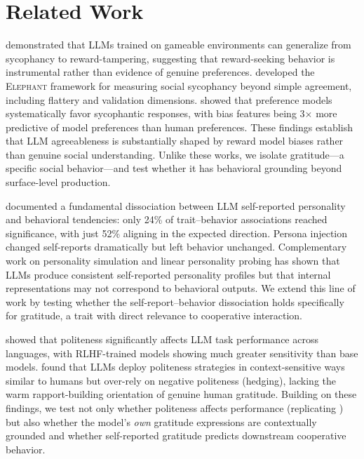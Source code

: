 \section{Related Work}
\label{sec:related}

\citet{denison2024sycophancy} demonstrated that LLMs trained on gameable environments can generalize from sycophancy to reward-tampering, suggesting that reward-seeking behavior is instrumental rather than evidence of genuine preferences. \citet{cheng2025elephant} developed the \textsc{Elephant} framework for measuring social sycophancy beyond simple agreement, including flattery and validation dimensions. \citet{bharadwaj2025flattery} showed that preference models systematically favor sycophantic responses, with bias features being 3$\times$ more predictive of model preferences than human preferences. These findings establish that LLM agreeableness is substantially shaped by reward model biases rather than genuine social understanding. Unlike these works, we isolate gratitude---a specific social behavior---and test whether it has behavioral grounding beyond surface-level production.

\citet{han2025personality} documented a fundamental dissociation between LLM self-reported personality and behavioral tendencies: only 24\% of trait--behavior associations reached significance, with just 52\% aligning in the expected direction. Persona injection changed self-reports dramatically but left behavior unchanged. Complementary work on personality simulation \citep{serapiogarcia2024personality} and linear personality probing \citep{linearprobing2025} has shown that LLMs produce consistent self-reported personality profiles but that internal representations may not correspond to behavioral outputs. We extend this line of work by testing whether the self-report--behavior dissociation holds specifically for gratitude, a trait with direct relevance to cooperative interaction.

\citet{yin2024politeness} showed that politeness significantly affects LLM task performance across languages, with RLHF-trained models showing much greater sensitivity than base models. \citet{zhao2025politeness} found that LLMs deploy politeness strategies in context-sensitive ways similar to humans but over-rely on negative politeness (hedging), lacking the warm rapport-building orientation of genuine human gratitude. Building on these findings, we test not only whether politeness affects performance (replicating \citealt{yin2024politeness}) but also whether the model's \emph{own} gratitude expressions are contextually grounded and whether self-reported gratitude predicts downstream cooperative behavior.

